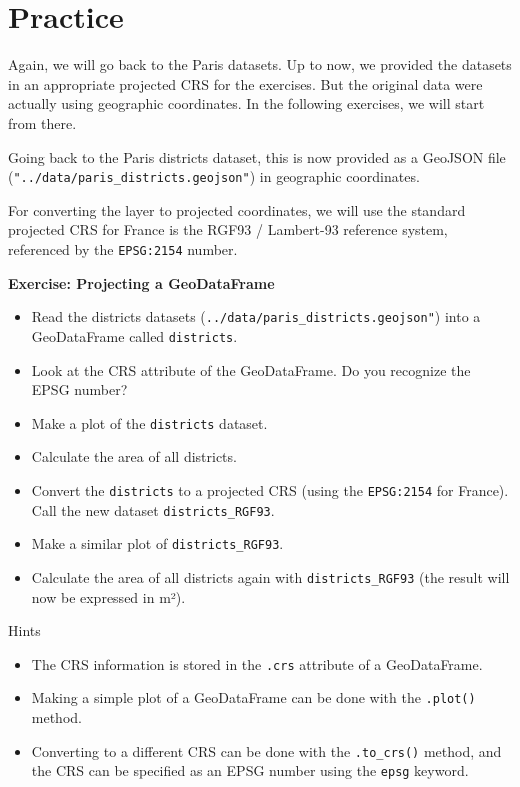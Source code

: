 \documentclass[
  letterpaper,
  DIV=11,
  numbers=noendperiod]{scrreprt}
\providecommand{\tightlist}{%
  \setlength{\itemsep}{0pt}\setlength{\parskip}{0pt}}\usepackage{longtable,booktabs,array}
\begin{document}
\section{Practice}\label{practice-1}

Again, we will go back to the Paris datasets. Up to now, we provided the
datasets in an appropriate projected CRS for the exercises. But the
original data were actually using geographic coordinates. In the
following exercises, we will start from there.

Going back to the Paris districts dataset, this is now provided as a
GeoJSON file (\texttt{"../data/paris\_districts.geojson"}) in geographic
coordinates.

For converting the layer to projected coordinates, we will use the
standard projected CRS for France is the RGF93 / Lambert-93 reference
system, referenced by the \texttt{EPSG:2154} number.

\textbf{Exercise: Projecting a GeoDataFrame}

\begin{itemize}
\tightlist
\item
  Read the districts datasets
  (\texttt{../data/paris\_districts.geojson"}) into a GeoDataFrame
  called \texttt{districts}.
\item
  Look at the CRS attribute of the GeoDataFrame. Do you recognize the
  EPSG number?
\item
  Make a plot of the \texttt{districts} dataset.
\item
  Calculate the area of all districts.
\item
  Convert the \texttt{districts} to a projected CRS (using the
  \texttt{EPSG:2154} for France). Call the new dataset
  \texttt{districts\_RGF93}.
\item
  Make a similar plot of \texttt{districts\_RGF93}.
\item
  Calculate the area of all districts again with
  \texttt{districts\_RGF93} (the result will now be expressed in m²).
\end{itemize}

Hints

\begin{itemize}
\tightlist
\item
  The CRS information is stored in the \texttt{.crs} attribute of a
  GeoDataFrame.
\item
  Making a simple plot of a GeoDataFrame can be done with the
  \texttt{.plot()} method.
\item
  Converting to a different CRS can be done with the \texttt{.to\_crs()}
  method, and the CRS can be specified as an EPSG number using the
  \texttt{epsg} keyword.
\end{itemize}
\end{document}
